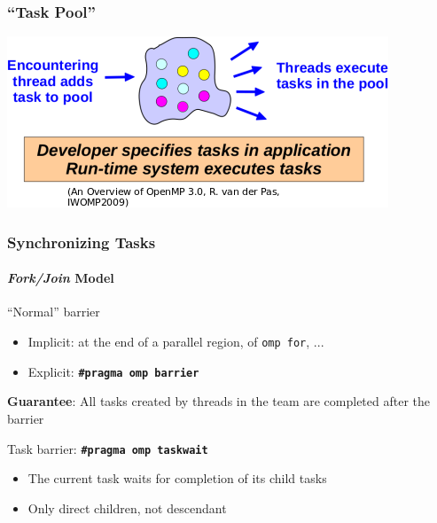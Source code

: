 \documentclass{beamer}
\begin{document}

\begin{frame}
  \frametitle{``Task Pool''}

  \includegraphics[width=\textwidth]{omp_task_pool.png}
\end{frame}



\begin{frame}
  \frametitle{Synchronizing Tasks}
  \framesubtitle{\emph{Fork/Join} Model}
  

  \begin{block}{``Normal'' barrier}
    \begin{itemize}
    \item Implicit: at the end of a parallel region, of \texttt{omp for}, ...
    \item Explicit: \texttt{\bf \#pragma omp barrier}
    \end{itemize}

    \medskip
    
    \textbf{Guarantee}: All tasks created by threads in the team are completed
    after the barrier
  \end{block}
  
  \bigskip
  
  \begin{exampleblock}{Task barrier: \texttt{\bf \#pragma omp taskwait}}
    \begin{itemize}
    \item The current task waits for completion of its \alert{child} tasks
    \item Only direct children, not descendant
    \end{itemize}
  \end{exampleblock}  
\end{frame}

\end{document}
